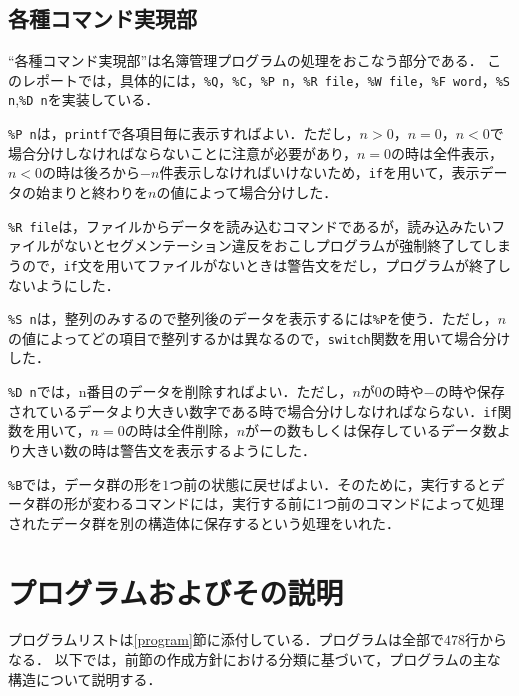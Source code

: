\documentclass[a4j,11pt]{jarticle}
\begin{document}
\subsection{各種コマンド実現部} \label{sec:do}
``各種コマンド実現部''は名簿管理プログラムの処理をおこなう部分である．
このレポートでは，具体的には，\verb|%Q|，\verb|%C|，\verb|%P n|，\verb|%R file|，\verb|%W file|，\verb|%F word|，\verb|%S n|,\verb|%D n|を実装している．

\verb|%P n|は，\verb|printf|で各項目毎に表示すればよい．ただし，$n>0，n=0，n<0$で場合分けしなければならないことに注意が必要があり，$n=0$の時は全件表示，$n<0$の時は後ろから$-n$件表示しなければいけないため，\verb|if|を用いて，表示データの始まりと終わりを$n$の値によって場合分けした．

\verb|%R file|は，ファイルからデータを読み込むコマンドであるが，読み込みたいファイルがないとセグメンテーション違反をおこしプログラムが強制終了してしまうので，\verb|if|文を用いてファイルがないときは警告文をだし，プログラムが終了しないようにした．

\verb|%S n|は，整列のみするので整列後のデータを表示するには\verb|%P|を使う．ただし，$n$の値によってどの項目で整列するかは異なるので，\verb|switch|関数を用いて場合分けした．

\verb|%D n|では，n番目のデータを削除すればよい．ただし，$n$が$0$の時や$-$の時や保存されているデータより大きい数字である時で場合分けしなければならない．\verb|if|関数を用いて，$n=0$の時は全件削除，$n$が$ー$の数もしくは保存しているデータ数より大きい数の時は警告文を表示するようにした．



\verb|%B|では，データ群の形を$1$つ前の状態に戻せばよい．そのために，実行するとデータ群の形が変わるコマンドには，実行する前に1つ前のコマンドによって処理されたデータ群を別の構造体に保存するという処理をいれた．


\section{プログラムおよびその説明}
プログラムリストは\ref{program}節に添付している．プログラムは全部で$478$行からなる．
以下では，前節の作成方針における分類に基づいて，プログラムの主な構造について説明する．
\end{document}
